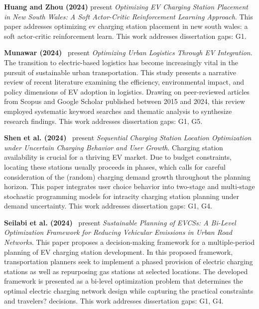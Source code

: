 \documentclass[letterpaper, 12pt, oneside, doublespacing]{Thesis}
\begin{document}
\noindent \textbf{Huang and Zhou (2024)} present \textit{Optimizing EV Charging Station Placement in New South Wales: A Soft Actor-Critic Reinforcement Learning Approach}. This paper addresses optimizing ev charging station placement in new south wales: a soft actor-critic reinforcement learn. This work addresses dissertation gaps: G1.



\noindent \textbf{Munawar (2024)}~\cite{optimizing_urban_2024} present \textit{Optimizing Urban Logistics Through EV Integration}. The transition to electric-based logistics has become increasingly vital in the pursuit of sustainable urban transportation. This study presents a narrative review of recent literature examining the efficiency, environmental impact, and policy dimensions of EV adoption in logistics. Drawing on peer-reviewed articles from Scopus and Google Scholar published between 2015 and 2024, this review employed systematic keyword searches and thematic analysis to synthesize research findings. This work addresses dissertation gaps: G1, G5.



\noindent \textbf{Shen et al. (2024)}~\cite{sequential_charging_2024} present \textit{Sequential Charging Station Location Optimization under Uncertain Charging Behavior and User Growth}. Charging station availability is crucial for a thriving EV market. Due to budget constraints, locating these stations usually proceeds in phases, which calls for careful consideration of the (random) charging demand growth throughout the planning horizon. This paper integrates user choice behavior into two-stage and multi-stage stochastic programming models for intracity charging station planning under demand uncertainty. This work addresses dissertation gaps: G1, G4.



\noindent \textbf{Seilabi et al. (2024)}~\cite{sustainable_planning_2024} present \textit{Sustainable Planning of EVCSs: A Bi-Level Optimization Framework for Reducing Vehicular Emissions in Urban Road Networks}. This paper proposes a decision-making framework for a multiple-period planning of EV charging station development. In this proposed framework, transportation planners seek to implement a phased provision of electric charging stations as well as repurposing gas stations at selected locations. The developed framework is presented as a bi-level optimization problem that determines the optimal electric charging network design while capturing the practical constraints and travelers? decisions. This work addresses dissertation gaps: G1, G4.
\end{document}
